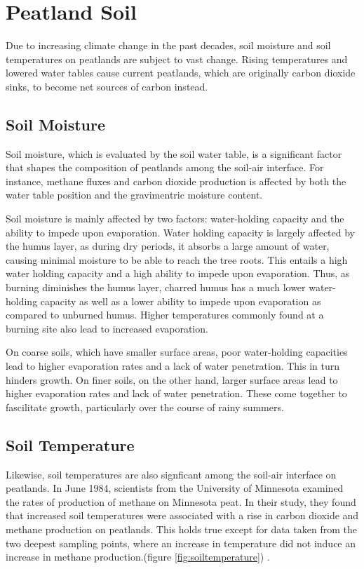 \section{Peatland Soil}

Due to increasing climate change in the past decades, soil moisture and soil temperatures on peatlands are subject to vast change. Rising temperatures and lowered water tables cause current peatlands, which are originally carbon dioxide sinks, to become net sources of carbon instead.

\subsection{Soil Moisture}

Soil moisture, which is evaluated by the soil water table, is a significant factor that shapes the composition of peatlands among the soil-air interface. For instance, methane fluxes and carbon dioxide production is affected by both the water table position and the gravimentric moisture content.

Soil moisture is mainly affected by two factors: water-holding capacity and the ability to impede upon evaporation. Water holding capacity is largely affected by the humus layer, as during dry periods, it absorbs a large amount of water, causing minimal moisture to be able to reach the tree roots. This entails a high water holding capacity and a high ability to impede upon evaporation. Thus, as burning diminishes the humus layer, charred humus has a much lower water-holding capacity as well as a lower ability to impede upon evaporation as compared to unburned humus. Higher temperatures commonly found at a burning site also lead to increased evaporation. \citep{kozlowski2012fire}

On coarse soils, which have smaller surface areas, poor water-holding capacities lead to higher evaporation rates and a lack of water penetration. This in turn hinders growth. On finer soils, on the other hand, larger surface areas lead to higher evaporation rates and lack of water penetration. These come together to fascilitate growth, particularly over the course of rainy summers.

\subsection{Soil Temperature}

Likewise, soil temperatures are also signficant among the soil-air interface on peatlands. In June 1984, scientists from the University of Minnesota examined the rates of production of methane on Minnesota peat. In their study, they found that increased soil temperatures were associated with a rise in carbon dioxide and methane production on peatlands. This holds true except for data taken from the two deepest sampling points, where an increase in temperature did not induce an increase in methane production.(figure \ref{fig:soiltemperature}) \citep{williams1984methane}.

